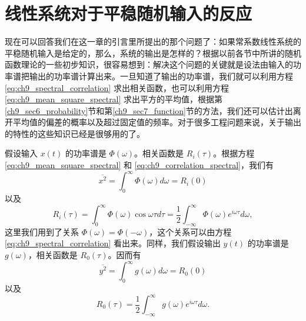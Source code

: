 \section{线性系统对于平稳随机输入的反应}

现在可以回答我们在这一章的引言里所提出的那个问题了：如果常系数线性系统的平稳随机输入是给定的，那么，系统的输出是怎样的？根据以前各节中所讲的随机函数理论的一些初步知识，很容易想到：解决这个问题的关键就是设法由输入的功率谱把输出的功率谱计算出来。一旦知道了输出的功率谱，我们就可以利用方程 \eqref{eq:ch9_spectral_correlation} 求出相关函数，也可以利用方程 \eqref{eq:ch9_mean_square_spectral} 求出平方的平均值，根据第\ref{ch9_sec6_probability}节和第\ref{ch9_sec7_function}节的方法，我们还可以估计出离开平均值的偏差的概率以及超过固定值的频率。对于很多工程问题来说，关于输出的特性的这些知识已经是很够用的了。

假设输入 $ x(t) $ 的功率谱是 $ \Phi(\omega) $。相关函数是 $ R_i(\tau) $。根据方程 \eqref{eq:ch9_mean_square_spectral} 和 \eqref{eq:ch9_correlation_spectral}，我们有
\begin{equation}\label{eq:ch9_input_mean_square}
\overline{x^2} = \int_0^\infty \Phi(\omega) d\omega = R_i(0)
\end{equation}
以及
\begin{equation}\label{eq:ch9_input_correlation}
R_i(\tau) = \int_0^\infty \Phi(\omega) \cos \omega \tau d\tau = \frac{1}{2} \int_{-\infty}^\infty \Phi(\omega) e^{i\omega \tau} d\omega,
\end{equation}
这里我们用到了关系 $ \Phi(\omega) = \Phi(-\omega) $，这个关系可以由方程 \eqref{eq:ch9_spectral_correlation} 看出来。同样，我们假设输出 $ y(t) $ 的功率谱是 $ g(\omega) $，相关函数是 $ R_0(\tau) $。因而有
\begin{equation}\label{eq:ch9_output_mean_square}
\overline{y^2} = \int_0^\infty g(\omega) d\omega = R_0(0)
\end{equation}
以及
\begin{equation}\label{eq:ch9_output_correlation}
R_0(\tau) = \frac{1}{2} \int_{-\infty}^{\infty} g(\omega) e^{i\omega \tau} d\omega.
\end{equation}

